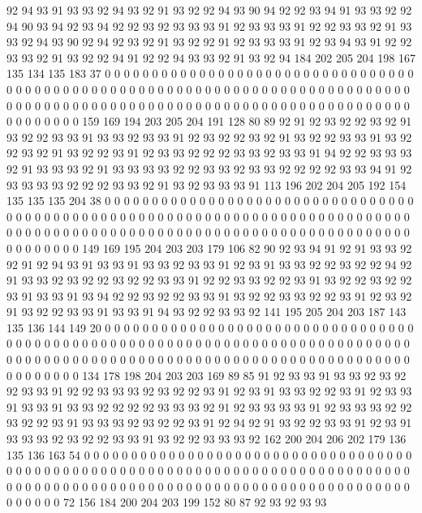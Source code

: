 92 94 93 91 93 93 92 94 93 92 91 93 92 92 94 93 90 94 92 92
93 94 91 93 93 92 92 94 90 93 94 92 93 94 92 92 93 92 93 93
93 91 92 93 93 93 91 92 92 93 93 92 91 93 93 92 94 93 90 92
94 92 93 92 91 93 92 92 91 92 93 93 93 91 92 93 94 93 91 92
92 93 93 92 91 93 92 92 94 91 92 92 94 93 93 92 91 93 92 94
184 202 205 204 198 167 135 134 135 183 37 0 0 0 0 0 0 0 0 0
0 0 0 0 0 0 0 0 0 0 0 0 0 0 0 0 0 0 0 0
0 0 0 0 0 0 0 0 0 0 0 0 0 0 0 0 0 0 0 0
0 0 0 0 0 0 0 0 0 0 0 0 0 0 0 0 0 0 0 0
0 0 0 0 0 0 0 0 0 0 0 0 0 0 0 0 0 0 0 0
0 0 0 0 0 0 0 0 0 0 0 0 0 0 0 0 0 0 0 0
0 0 0 0 0 0 0 0 0 0 0 0 0 0 0 0 0 0 159 169
194 203 205 204 191 128 80 89 92 91 92 93 92 92 93 92 91 93 92 92
93 93 91 93 93 92 93 93 91 92 93 92 92 93 92 91 93 92 92 93
93 91 93 92 92 93 92 91 93 92 92 93 91 92 93 93 92 92 92 93
93 92 93 93 91 94 92 92 93 93 93 92 91 93 93 93 92 91 93 93
93 93 92 92 93 93 92 93 93 92 92 92 92 93 93 94 91 92 93 93
93 93 92 92 92 93 93 92 91 93 92 93 93 93 91 113 196 202 204 205
192 154 135 135 135 204 38 0 0 0 0 0 0 0 0 0 0 0 0 0
0 0 0 0 0 0 0 0 0 0 0 0 0 0 0 0 0 0 0 0
0 0 0 0 0 0 0 0 0 0 0 0 0 0 0 0 0 0 0 0
0 0 0 0 0 0 0 0 0 0 0 0 0 0 0 0 0 0 0 0
0 0 0 0 0 0 0 0 0 0 0 0 0 0 0 0 0 0 0 0
0 0 0 0 0 0 0 0 0 0 0 0 0 0 0 0 0 0 0 0
0 0 0 0 0 0 0 0 0 0 0 0 0 0 149 169 195 204 203 203
179 106 82 90 92 93 94 91 92 91 93 93 92 92 91 92 94 93 91 93
93 91 93 93 92 93 93 91 92 93 91 93 93 92 92 93 92 92 94 92
91 93 93 92 93 92 92 93 92 92 93 93 91 92 92 93 93 92 92 93
91 93 92 92 93 92 92 93 91 93 93 91 93 94 92 92 93 92 92 93
93 91 93 92 92 93 93 92 92 93 91 92 93 92 91 93 92 92 93 93
91 93 93 91 94 93 92 92 93 93 92 141 195 205 204 203 187 143 135 136
144 149 20 0 0 0 0 0 0 0 0 0 0 0 0 0 0 0 0 0
0 0 0 0 0 0 0 0 0 0 0 0 0 0 0 0 0 0 0 0
0 0 0 0 0 0 0 0 0 0 0 0 0 0 0 0 0 0 0 0
0 0 0 0 0 0 0 0 0 0 0 0 0 0 0 0 0 0 0 0
0 0 0 0 0 0 0 0 0 0 0 0 0 0 0 0 0 0 0 0
0 0 0 0 0 0 0 0 0 0 0 0 0 0 0 0 0 0 0 0
0 0 0 0 0 0 0 0 0 0 134 178 198 204 203 203 169 89 85 91
92 93 93 91 93 93 92 93 92 92 93 93 91 92 92 93 93 93 92 93
92 92 93 91 92 93 91 93 93 92 92 93 91 92 93 93 91 93 93 91
93 93 92 92 92 92 93 93 93 92 91 92 93 93 93 93 91 92 93 93
93 92 92 93 92 92 93 91 93 93 93 92 93 92 92 93 91 92 94 92
91 93 92 92 93 93 91 92 93 91 93 93 93 92 93 92 92 93 93 91
93 92 92 93 93 93 92 162 200 204 206 202 179 136 135 136 163 54 0 0
0 0 0 0 0 0 0 0 0 0 0 0 0 0 0 0 0 0 0 0
0 0 0 0 0 0 0 0 0 0 0 0 0 0 0 0 0 0 0 0
0 0 0 0 0 0 0 0 0 0 0 0 0 0 0 0 0 0 0 0
0 0 0 0 0 0 0 0 0 0 0 0 0 0 0 0 0 0 0 0
0 0 0 0 0 0 0 0 0 0 0 0 0 0 0 0 0 0 0 0
0 0 0 0 0 0 0 0 0 0 0 0 0 0 0 0 0 0 0 0
0 0 0 0 0 72 156 184 200 204 203 199 152 80 87 92 93 92 93 93
